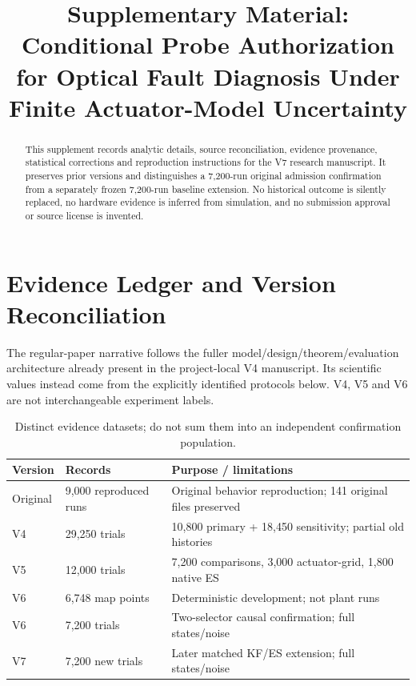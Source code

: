 \documentclass[10pt,journal]{IEEEtran}
\begin{document}
\title{Supplementary Material: Conditional Probe Authorization for Optical Fault Diagnosis Under Finite Actuator-Model Uncertainty}
\author{}\maketitle
\begin{abstract}
This supplement records analytic details, source reconciliation, evidence provenance, statistical corrections and reproduction instructions for the V7 research manuscript. It preserves prior versions and distinguishes a 7,200-run original admission confirmation from a separately frozen 7,200-run baseline extension. No historical outcome is silently replaced, no hardware evidence is inferred from simulation, and no submission approval or source license is invented.
\end{abstract}
\section{Evidence Ledger and Version Reconciliation}
The regular-paper narrative follows the fuller model/design/theorem/evaluation architecture already present in the project-local V4 manuscript. Its scientific values instead come from the explicitly identified protocols below. V4, V5 and V6 are not interchangeable experiment labels.

\begin{table}[!b]
\caption{Distinct evidence datasets; do not sum them into an independent confirmation population.}
\centering\footnotesize\setlength{\tabcolsep}{3pt}
\begin{tabular}{@{}p{}p{}p{}@{}}\toprule
Version & Records & Purpose / limitations\\\midrule
Original & 9,000 reproduced runs & Original behavior reproduction; 141 original files preserved\\
V4 & 29,250 trials & 10,800 primary + 18,450 sensitivity; partial old histories\\
V5 & 12,000 trials & 7,200 comparisons, 3,000 actuator-grid, 1,800 native ES\\
V6 & 6,748 map points & Deterministic development; not plant runs\\
V6 & 7,200 trials & Two-selector causal confirmation; full states/noise\\
V7 & 7,200 new trials & Later matched KF/ES extension; full states/noise\\\bottomrule
\end{tabular}
\end{table}
\end{document}
